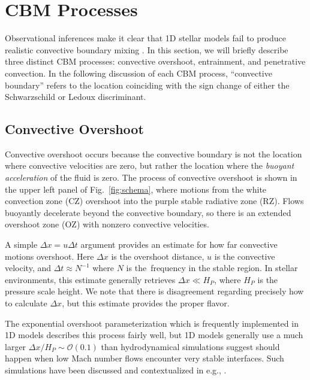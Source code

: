 \section{CBM Processes}
\label{sec:processes}

Observational inferences make it clear that 1D stellar models fail to produce realistic convective boundary mixing \citep[CBM,][]{pinsonneault_1997, claret_torres_2018, pedersen_etal_2021}.
In this section, we will briefly describe three distinct CBM processes: convective overshoot, entrainment, and penetrative convection.
In the following discussion of each CBM process, ``convective boundary'' refers to the location coinciding with the sign change of either the Schwarzschild or Ledoux discriminant.

\subsection{Convective Overshoot}
Convective overshoot occurs because the convective boundary is not the location where convective velocities are zero, but rather the location where the \emph{buoyant acceleration} of the fluid is zero.
The process of convective overshoot is shown in the upper left panel of Fig.~\ref{fig:schema}, where motions from the white convection zone (CZ) overshoot into the purple stable radiative zone (RZ).
Flows buoyantly decelerate beyond the convective boundary, so there is an extended overshoot zone (OZ) with nonzero convective velocities.

A simple $\Delta x = u \Delta t$ argument provides an estimate for how far convective motions overshoot.
Here $\Delta x$ is the overshoot distance, $u$ is the convective velocity, and $\Delta t \approx N^{-1}$ where $N$ is the \brunt$\,$frequency in the stable region.
In stellar environments, this estimate generally retrieves $\Delta x \ll H_P$, where $H_P$ is the pressure scale height.
We note that there is disagreement regarding precisely how to calculate $\Delta x$, but this estimate provides the proper flavor.

The exponential overshoot parameterization \citep[per e.g.,][]{herwig_2000} which is frequently implemented in 1D models describes this process fairly well, but 1D models generally use a much larger $\Delta x/H_P \sim \mathcal{O}(0.1)$ than hydrodynamical simulations suggest should happen when low Mach number flows encounter very stable interfaces.
Such simulations have been discussed and contextualized in e.g., \citet{korre_etal_2019}.

